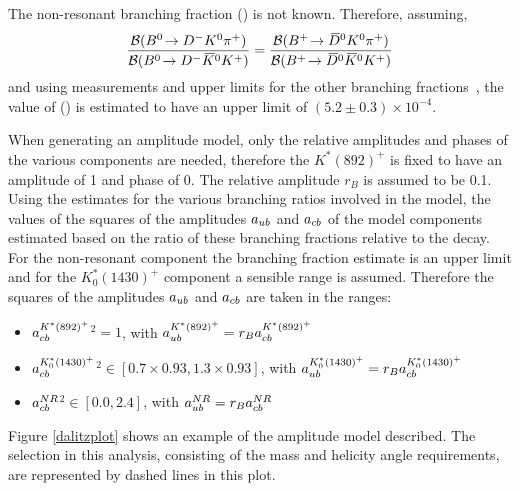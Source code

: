 The non-resonant branching fraction \BR(\decay{\Bp}{\Dzb\KS\pip}) is not known. Therefore, assuming,
\begin{equation*}
\frac{{\mathcal{B}}({{B}^0}\!\rightarrow {\ensuremath{{D}^-}}{\ensuremath{{K}^0}}{\ensuremath{{\pi}^+}})}{{\mathcal{B}}({{B}^0}\!\rightarrow {\ensuremath{{D}^-}}{\ensuremath{{\kern 0.2em\overline{\kern -0.2em K}{}}{}^0}}{\ensuremath{{K}^+}})} = \frac{{\mathcal{B}}({{{B}^+}}\!\rightarrow {\ensuremath{{\kern 0.2em\overline{\kern -0.2em D}{}}{}^0}}{\ensuremath{{K}^0}}{\ensuremath{{\pi}^+}})}{{\mathcal{B}}({{{B}^+}}\!\rightarrow {\ensuremath{{\kern 0.2em\overline{\kern -0.2em D}{}}{}^0}}{\ensuremath{{\kern 0.2em\overline{\kern -0.2em K}{}}{}^0}}{\ensuremath{{K}^+}})}
\end{equation*}
and using measurements and upper limits for the other branching fractions~\cite{PDG2014}, the value of \BR(\decay{\Bp}{\Dzb\KS\pip}) is estimated to have an upper limit of $(5.2 \pm 0.3) \times 10^{-4}$.

When generating an amplitude model, only the relative amplitudes and phases of the various components are needed, therefore the $K^*(892)^+$ is fixed to have an amplitude of 1 and phase of 0. The relative amplitude $r_B$ is assumed to be 0.1. Using the estimates for the various branching ratios involved in the model, the values of the squares of the amplitudes $a_{{u}{b}}$ and $a_{{c}{b}}$ of the model components estimated based on the ratio of these branching fractions relative to the  decay. For the non-resonant component the branching fraction estimate is an upper limit and for the $K^*_0(1430)^+$  component a sensible range is assumed. Therefore the squares of the amplitudes $a_{{u}{b}}$ and $a_{{c}{b}}$ are taken in the ranges:

\begin{itemize}
\item \textbar $a_{{c}{b}}^{K^*(892)^+}$\textbar$^2 = 1$, \hspace{12pt} with $a_{{u}{b}}^{K^*(892)^+} = r_B a_{{c}{b}}^{K^*(892)^+}$
\item \textbar $a_{{c}{b}}^{K^*_0(1430)^+}$\textbar$^2 \in [0.7 \times 0.93,1.3 \times 0.93]$, \hspace{14pt} with $a_{{u}{b}}^{K^*_0(1430)^+} = r_B a_{{c}{b}}^{K^*_0(1430)^+}$
\item \textbar $a_{{c}{b}}^{NR}$\textbar$^2 \in [0.0,2.4]$, \hspace{12pt} with $a_{{u}{b}}^{NR} = r_B a_{{c}{b}}^{NR}$
\end{itemize}

Figure \ref{dalitzplot} shows an example of the amplitude model described. The \Kstar selection in this analysis, consisting of the \Kstar mass and \KS helicity angle requirements, are represented by dashed lines in this plot.

